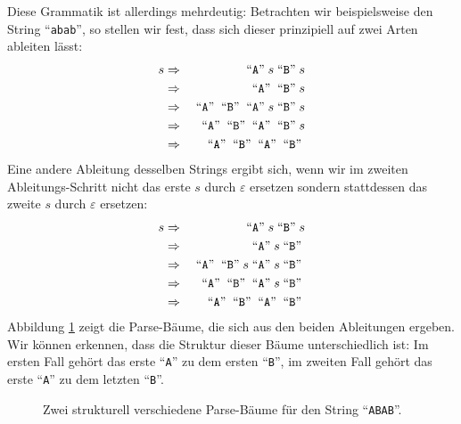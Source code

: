 Diese Grammatik ist allerdings mehrdeutig: Betrachten wir beispielsweise den String 
``\texttt{abab}'', so stellen wir fest, dass sich dieser prinzipiell auf zwei Arten ableiten l\"asst:
\begin{eqnarray*}
  s & \Rightarrow &\;\mbox{``\texttt{A}''}\; s \;\mbox{``\texttt{B}''}\; s                       \\
    & \Rightarrow &\;\mbox{``\texttt{A}''}\; \;\mbox{``\texttt{B}''}\; s                         \\
    & \Rightarrow &\;\mbox{``\texttt{A}''}\; \;\mbox{``\texttt{B}''}\;\;\mbox{``\texttt{A}''}\; s \;\mbox{``\texttt{B}''}\; s \\
    & \Rightarrow &\;\mbox{``\texttt{A}''}\; \;\mbox{``\texttt{B}''}\;\;\mbox{``\texttt{A}''}\; \;\mbox{``\texttt{B}''}\; s   \\
    & \Rightarrow &\;\mbox{``\texttt{A}''}\; \;\mbox{``\texttt{B}''}\;\;\mbox{``\texttt{A}''}\; \;\mbox{``\texttt{B}''}\; 
\end{eqnarray*}
Eine andere Ableitung desselben Strings ergibt sich, wenn wir im zweiten Ableitungs-Schritt nicht das erste
$s$ durch $\varepsilon$ ersetzen sondern stattdessen das zweite $s$ durch $\varepsilon$ ersetzen:
\begin{eqnarray*}
  s & \Rightarrow &\;\mbox{``\texttt{A}''}\; s \;\mbox{``\texttt{B}''}\; s                       \\
    & \Rightarrow &\;\mbox{``\texttt{A}''}\; s \;\mbox{``\texttt{B}''}\;                         \\
    & \Rightarrow &\;\mbox{``\texttt{A}''}\; \;\mbox{``\texttt{B}''}\; s\;\mbox{``\texttt{A}''}\; s \;\mbox{``\texttt{B}''}\; \\
    & \Rightarrow &\;\mbox{``\texttt{A}''}\; \;\mbox{``\texttt{B}''}\;\;\mbox{``\texttt{A}''}\; s \;\mbox{``\texttt{B}''}\;   \\
    & \Rightarrow &\;\mbox{``\texttt{A}''}\; \;\mbox{``\texttt{B}''}\;\;\mbox{``\texttt{A}''}\; \;\mbox{``\texttt{B}''}\;     \\
\end{eqnarray*}
Abbildung \ref{fig:ambiguous-a.dot} zeigt die Parse-B\"aume, die sich aus den beiden Ableitungen ergeben.
Wir k\"onnen erkennen, dass die Struktur dieser B\"aume unterschiedlich ist:  Im ersten Fall geh\"ort das erste
``\texttt{A}'' zu dem ersten ``\texttt{B}'', im zweiten Fall geh\"ort das erste ``\texttt{A}'' zu dem letzten
``\texttt{B}''.

\begin{figure}[!ht]
\quad
  \caption{Zwei strukturell verschiedene Parse-B\"aume f\"ur den String ``\texttt{ABAB}''.}
  \label{fig:ambiguous-a.dot}
\end{figure}

